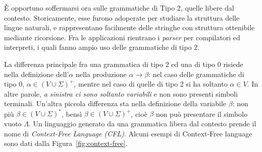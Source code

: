 \documentclass[10pt]{\classname}
\theoremstyle{newlinethm}
\theoremstyle{theorem}
\theoremstyle{definition}
\theoremstyle{definition}
\theoremstyle{definition}
\theoremstyle{definition}
\begin{document}
È opportuno soffermarsi ora sulle grammatiche di Tipo 2, quelle libere dal
contesto. Storicamente, esse furono adoperate per studiare la struttura delle
lingue naturali, e rappresentano facilmente delle stringhe con struttura
ottenibile mediante ricorsione. Fra le applicazioni rientrano i \emph{parser}
per compilatori ed interpreti, i quali fanno ampio uso delle grammatiche di
tipo 2.

La differenza principale fra una grammatica di tipo 2 ed una di tipo 0 risiede nella definizione dell'$\alpha$ nella produzione $\alpha \rightarrow \beta$: nel caso delle grammatiche di tipo 0, $\alpha \in (V \cup \Sigma)^+$, mentre nel caso di quelle di tipo 2 si ha soltanto $\alpha \in V$. In altre parole, \emph{a sinistra ci sono soltanto variabili} e non sono presenti simboli terminali. Un'altra piccola differenza sta nella definizione della variabile $\beta$: non più $\beta \in (V \cup \Sigma)^*$, bensì $\beta \in (V \cup \Sigma)^+$, cioè $\beta$ non può presentare il simbolo vuoto $\Lambda$. Un linguaggio generato da una grammatica libera dal contesto prende il nome di \emph{Context-Free Language (CFL)}. Alcuni esempi di Context-Free language sono dati dalla Figura~\ref{fig:context-free}.
\end{document}
